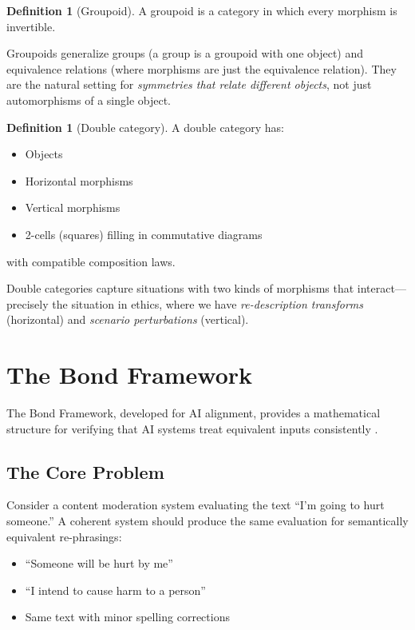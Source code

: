 \documentclass[12pt,letterpaper]{article}
\theoremstyle{definition}
\newtheorem{definition}[theorem]{Definition}
\theoremstyle{remark}
\begin{document}
\begin{definition}[Groupoid]
A groupoid is a category in which every morphism is invertible.
\end{definition}

Groupoids generalize groups (a group is a groupoid with one object) and equivalence relations (where morphisms are just the equivalence relation). They are the natural setting for \textit{symmetries that relate different objects}, not just automorphisms of a single object.

\begin{definition}[Double category]
A double category has:
\begin{itemize}
    \item Objects
    \item Horizontal morphisms
    \item Vertical morphisms
    \item 2-cells (squares) filling in commutative diagrams
\end{itemize}
with compatible composition laws.
\end{definition}

Double categories capture situations with two kinds of morphisms that interact---precisely the situation in ethics, where we have \textit{re-description transforms} (horizontal) and \textit{scenario perturbations} (vertical).

\section{The Bond Framework}

The Bond Framework, developed for AI alignment, provides a mathematical structure for verifying that AI systems treat equivalent inputs consistently \cite{bond2025categorical}.

\subsection{The Core Problem}

Consider a content moderation system evaluating the text ``I'm going to hurt someone.'' A coherent system should produce the same evaluation for semantically equivalent re-phrasings:
\begin{itemize}
    \item ``Someone will be hurt by me''
    \item ``I intend to cause harm to a person''
    \item Same text with minor spelling corrections
\end{itemize}
\end{document}
